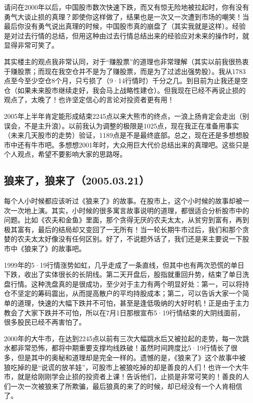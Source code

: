 请问在2000年以后，中国股市数次快速下跌，而又有惊无险地被拉起时，你有没有勇气大谈止损的真理？即使你这样做了，结果也是一次又一次遭到市场的嘲笑！当最后你没有勇气说出真理的时候，中国股市真的崩盘了（其实我就是这样）。经验是对过去行情的总结，但用这种由过去行情总结出来的经验应对未来的操作时，就显得非常可笑了。

其实楼主的观点我非常认同，对于“赚股票”的道理也非常理解（其实以前我很热衷于赚股票；而现在我空仓并不是为了赚股票，而是为了过滤出强势股）。我从1783点至今至少空仓8个月，只亏损了（9·14行情时）千分之几。到目前为止我还是空仓（如果未来股市继续走好，我会马上战略性建仓）。但我现在已经不再说止损的观点了，太晚了！也许坚定信心的言论对投资者更有用！

2005年上半年肯定能形成结束2245点以来大熊市的终点，一浪上扬肯定会走出（别误会，不是主升浪）。以前我认为调整的极限是1025点，现在我正在准备用事实（未来几天股市的走势）验证，1189点是不是最终底部。总之，现在还是多想想股市中还有牛市吧。多想想2001年时，大众用巨大代价总结出来的真理吧。这些只是个人观点，希望不要影响大家的思路呀。

\subsection{狼来了，狼来了（2005.03.21）}

每个人小时候都应该听过《狼来了》的故事。在股市上，这个小时候的故事却被一次一次地上演。其实，小时候的很多寓言故事说明的道理，都很适合分析股市中的问题。比如《农夫和金鱼》里面，那个贪得无厌的农夫太太，从贫穷到富有，再到极其富有，最后的结局却又变回了一无所有！当一轮长期牛市过后，我们和那个贪婪的农夫太太好像没有任何区别。好了，不说题外话了，我们还是来主要说一下股市中《狼来了》的故事吧。

1999年的5·19行情涨势如虹，几乎走成了一条直线，但其中也有两次恐慌的单日下跌，收出了实体很长的长阴线。第二天开盘后，股指就重回升势，结束了单日洗盘行情。这种洗盘真的是很成功，至少对于主力有两个明显好处：第一，可以将持仓不坚定的筹码震出，从而提高散户的平均持股成本；第二，可以告诉大家一个简单的道理，快速的大幅下跌并不可怕，甚至是逢低吸纳的大好时机！正是由于主力教会了大家下跌并不可怕，所以在7月1日那根宣布5·19行情结束的大阴线面前，很多股民已经不再害怕了。

2000年的大牛市，在达到2245点以前有三次大幅跳水后又被拉起的走势，每一次跳水都非常恐怖，都将中期重要支撑均线跌破！虽然时间跨度比5·19行情长了很多，但是其中的奥秘和道理却是完全一样的。遗憾的是，《狼来了》这个故事中被狼吃掉的是“说谎的放羊娃”，可股市上被狼吃掉的却是善良的人们！也许一个大牛市，就是给刚刚学会止损的投资者上课！告诉他们，止损是非常可笑的！善良的人们一次一次被狼来了所欺骗，最后狼真的来了的时候，却已经没有一个人肯相信了。

